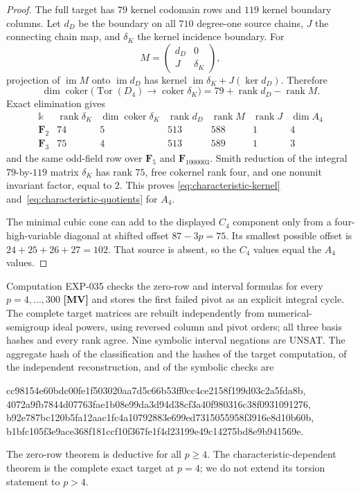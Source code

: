 \documentclass[11pt]{article}
\theoremstyle{definition}
\theoremstyle{remark}
\newcommand{\kfield}{\Bbbk}
\begin{document}
\begin{proof}
The full target has $79$ kernel codomain rows and $119$ kernel boundary columns. Let $d_D$
be the boundary on all $710$ degree-one source chains, $J$ the connecting chain map, and
$\delta_K$ the kernel incidence boundary. For
\[
M=\begin{pmatrix}d_D&0\\J&\delta_K\end{pmatrix},
\]
projection of $\operatorname{im}M$ onto $\operatorname{im}d_D$ has kernel
$\operatorname{im}\delta_K+J(\ker d_D)$. Therefore
\begin{equation}
\dim\operatorname{coker}\bigl(\operatorname{Tor}(D_4)\to
\operatorname{coker}\delta_K\bigr)=79+\operatorname{rank}d_D-\operatorname{rank}M.
\label{eq:complete-target-rank}
\end{equation}
Exact elimination gives
\[
\begin{array}{c|rrrrrr}
\kfield&\operatorname{rank}\delta_K&\dim\operatorname{coker}\delta_K&
\operatorname{rank}d_D&\operatorname{rank}M&\operatorname{rank}J&\dim A_4\\ \hline
\mathbf F_2&74&5&513&588&1&4\\
\mathbf F_3&75&4&513&589&1&3
\end{array}
\]
and the same odd-field row over $\mathbf F_5$ and $\mathbf F_{1000003}$. Smith reduction of
the integral $79$-by-$119$ matrix $\delta_K$ has rank $75$, free cokernel rank four, and
one nonunit invariant factor, equal to $2$. This proves
\eqref{eq:characteristic-kernel} and~\eqref{eq:characteristic-quotients} for $A_4$.

The minimal cubic cone can add to the displayed $C_4$ component only from a four-high-variable
diagonal at shifted offset $87-3p=75$. Its smallest possible offset is
$24+25+26+27=102$. That source is absent, so the $C_4$ values equal the $A_4$ values.
\end{proof}

Computation EXP-035 checks the zero-row and interval formulas for every $p=4,\ldots,300$
\textbf{[MV]} and stores the first failed pivot as an explicit integral cycle. The complete
target matrices are rebuilt independently from numerical-semigroup ideal powers, using reversed
column and pivot orders; all three basis hashes and every rank agree. Nine symbolic interval
negations are UNSAT. The aggregate hash of the classification and the hashes of the target
computation, of the independent reconstruction, and of the symbolic checks are
\begin{center}
{\fontsize{7}{8}\selectfont\ttfamily cc98154e60bdc00fe1f503020aa7d5c66b53ff0cc4ce2158f199d03c2a5fda8b},\\
{\fontsize{7}{8}\selectfont\ttfamily 4072a9fb7844d07763fae1b08e99da3d94d38cf3a40f980316c38f0931091276},\\
{\fontsize{7}{8}\selectfont\ttfamily b92e787bc120b5fa12aac1fc4a10792883e699ed7315055958f3916e8d10b60b},\\
{\fontsize{7}{8}\selectfont\ttfamily b1bfc105f3e9ace368f181ccf10f367fe1f4d23199e49c14275bd8e9b941569e}.
\end{center}
The zero-row theorem is deductive for all $p\ge4$. The characteristic-dependent theorem is the
complete exact target at $p=4$; we do not extend its torsion statement to $p>4$.
\end{document}
